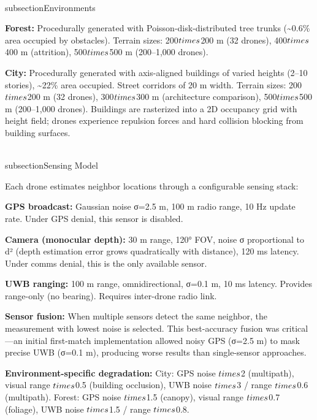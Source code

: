 \documentclass[conference]{IEEEtran}
\begin{document}
\\subsection{Environments}\label{b.-environments}

\textbf{Forest:} Procedurally generated with Poisson-disk-distributed
tree trunks (\textasciitilde0.6\% area occupied by obstacles). Terrain
sizes: 200$\\times$200 m (32 drones), 400$\\times$400 m (attrition), 500$\\times$500 m
(200--1,000 drones).

\textbf{City:} Procedurally generated with axis-aligned buildings of
varied heights (2--10 stories), \textasciitilde22\% area occupied.
Street corridors of 20 m width. Terrain sizes: 200$\\times$200 m (32 drones),
300$\\times$300 m (architecture comparison), 500$\\times$500 m (200--1,000 drones).
Buildings are rasterized into a 2D occupancy grid with height field;
drones experience repulsion forces and hard collision blocking from
building surfaces.

\\subsection{Sensing Model}\label{c.-sensing-model}

Each drone estimates neighbor locations through a configurable sensing
stack:

\textbf{GPS broadcast:} Gaussian noise σ=2.5 m, 100 m radio range, 10 Hz
update rate. Under GPS denial, this sensor is disabled.

\textbf{Camera (monocular depth):} 30 m range, 120° FOV, noise σ
proportional to d² (depth estimation error grows quadratically with
distance), 120 ms latency. Under comms denial, this is the only
available sensor.

\textbf{UWB ranging:} 100 m range, omnidirectional, σ=0.1 m, 10 ms
latency. Provides range-only (no bearing). Requires inter-drone radio
link.

\textbf{Sensor fusion:} When multiple sensors detect the same neighbor,
the measurement with lowest noise is selected. This best-accuracy fusion
was critical---an initial first-match implementation allowed noisy GPS
(σ=2.5 m) to mask precise UWB (σ=0.1 m), producing worse results than
single-sensor approaches.

\textbf{Environment-specific degradation:} City: GPS noise $\\times$2
(multipath), visual range $\\times$0.5 (building occlusion), UWB noise $\\times$3 /
range $\\times$0.6 (multipath). Forest: GPS noise $\\times$1.5 (canopy), visual range
$\\times$0.7 (foliage), UWB noise $\\times$1.5 / range $\\times$0.8.
\end{document}
